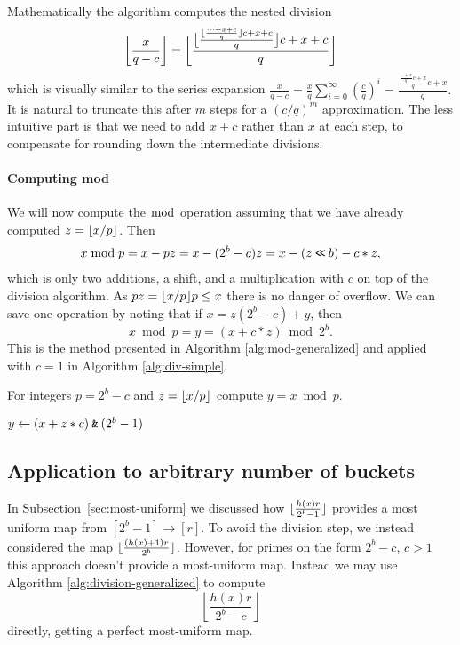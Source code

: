 Mathematically the algorithm computes the nested division
$$
\bbfloor{\frac{x}{q-c}}
=
\bbfloor{\frac{
   \bfloor{\frac{
      \floor{\frac{
         \dots+x+c
      }{q}}c +x+c
   }{q}}c +x+c
}{q}}
\vspace{-1em} %
$$
which is visually similar to the series expansion
$
   \frac{x}{q-c}
   = \frac{x}{q}\sum_{i=0}^\infty (\frac{c}{q})^i
   = \frac{\frac{\frac{\dots+x}{q}c+x}{q}c+x}{q}.
$
It is natural to truncate this after $m$ steps for a $(c/q)^m$ approximation.
The less intuitive part is that we need to add $x+c$ rather than $x$ at each step, to compensate for rounding down the intermediate divisions.

\paragraph{Computing mod}
We will now compute the $\bmod$ operation assuming that
we have already computed $z=\lfloor {x/p} \rfloor$. Then
\begin{align}
   x \bmod p
   = x - pz
   = x - (2^b-c)z
   = x - (z\mathbin{\texttt{<\!<}} b) - c*z,
\end{align}
which is only two additions, a shift, and a multiplication with $c$ on top of the division algorithm.
As $pz = \lfloor {x/p} \rfloor p \le x$ there is no danger of overflow.
We can save one operation by noting
that if $x = z (2^b-c) + y$, then
$$x\bmod p = y=\left(x+c*z \right) \bmod 2^b.$$
This is the method presented in Algorithm \ref{alg:mod-generalized} and applied with $c=1$ in Algorithm \ref{alg:div-simple}.
\begin{algorithm}[H]
   \caption{For integers $p=2^b-c$ and $z=\lfloor {x/p} \rfloor$ compute
      $y=x \bmod p$.}
   \label{alg:mod-generalized}
   \begin{algorithmic}
      \State $y \gets (x + z*c) \mathbin{\texttt{\&}} (2^b-1)$
   \end{algorithmic}
\end{algorithm}




\subsection{Application to arbitrary number of buckets}\label{sec:pseudo-arbitrary}
In Subsection~\ref{sec:most-uniform} we discussed how $\lfloor {\frac{h(x)r}{2^b-1}} \rfloor$ provides a most uniform map from $[2^b-1]\to[r]$.
To avoid the division step, we instead considered the map
$\lfloor {\frac{(h(x)+1)r}{2^b}} \rfloor$.
However, for primes on the form $2^b-c$, $c>1$ this approach doesn't provide a most-uniform map.
%
Instead we may use Algorithm \ref{alg:division-generalized} to compute
$$\left\lfloor\frac{h(x)r}{2^b-c}\right\rfloor$$
directly, getting a perfect most-uniform map.


